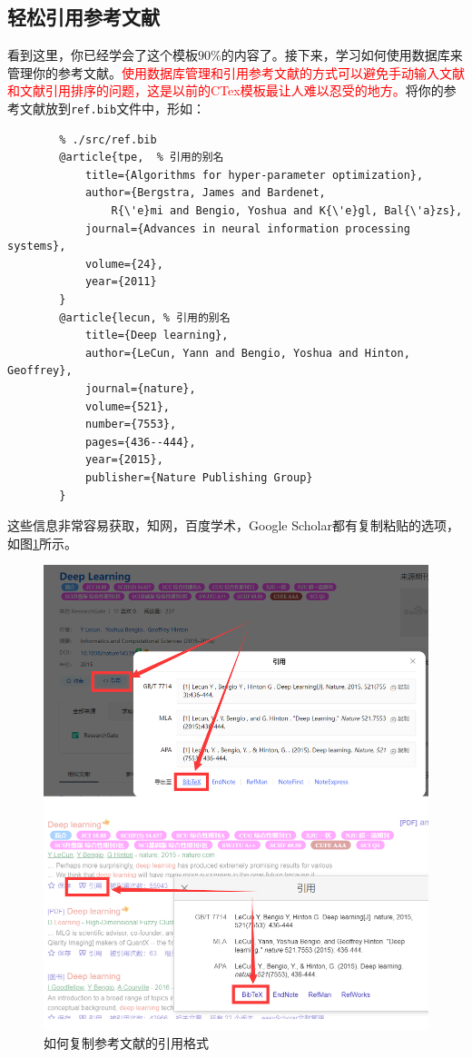 \subsection{轻松引用参考文献}
看到这里，你已经学会了这个模板$90\%$的内容了。接下来，学习如何使用数据库来管理你的参考文献。\textcolor{red}{使用数据库管理和引用参考文献的方式可以避免手动输入文献和文献引用排序的问题，这是以前的CTex模板最让人难以忍受的地方。}将你的参考文献放到\verb|ref.bib|文件中，形如：
\begin{tcolorbox}[colback=gray!10,
    colframe=black,
    width=16cm,
    arc=1mm, auto outer arc,
    boxrule=0.5pt,]
    \begin{verbatim}
        % ./src/ref.bib
        @article{tpe,  % 引用的别名
            title={Algorithms for hyper-parameter optimization},
            author={Bergstra, James and Bardenet,
                R{\'e}mi and Bengio, Yoshua and K{\'e}gl, Bal{\'a}zs},
            journal={Advances in neural information processing systems},
            volume={24},
            year={2011}
        }
        @article{lecun, % 引用的别名
            title={Deep learning},
            author={LeCun, Yann and Bengio, Yoshua and Hinton, Geoffrey},
            journal={nature},
            volume={521},
            number={7553},
            pages={436--444},
            year={2015},
            publisher={Nature Publishing Group}
        }
    \end{verbatim}
\end{tcolorbox}
这些信息非常容易获取，知网，百度学术，Google Scholar都有复制粘贴的选项，如图\ref{fig:citebib}所示。
\begin{figure}[H]
    \centering
    \includegraphics[scale=0.3]{img/demoref.png}
    \caption{如何复制参考文献的引用格式}
    \label{fig:citebib}
\end{figure}

